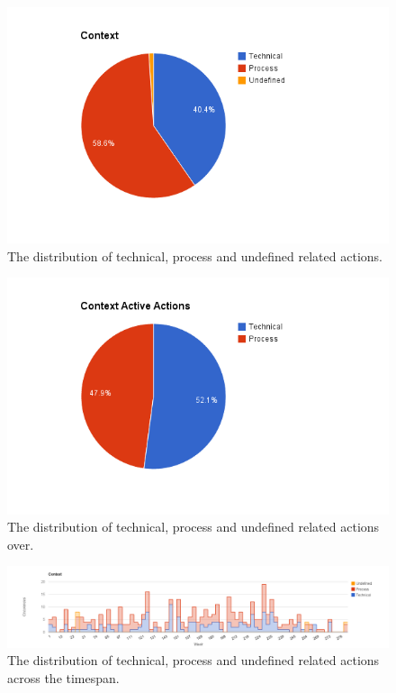 \begin{figure}[!h]
	\centering
	\includegraphics[width=\textwidth, keepaspectratio]{figures/context-p.png}
	\caption{The distribution of technical, process and undefined related actions.}
	\label{figure:context-p}
\end{figure}

\begin{figure}[!h]
	\centering
	\includegraphics[width=\textwidth, keepaspectratio]{figures/context-pa.png}
	\caption{The distribution of technical, process and undefined related actions over.}
	\label{figure:context-pa}
\end{figure}

\begin{figure}
	\centering
	\includegraphics[width=\textwidth, keepaspectratio]{figures/context-l.png}
	\caption{The distribution of technical, process and undefined related actions across the timespan.}
	\label{figure:context-la}
\end{figure}

